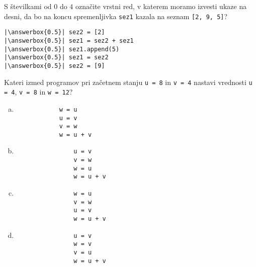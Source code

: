 \documentclass[arhiv, 10pt]{../izpit}
\newcommand{\inlinepy}[1]{\texttt{#1}}
\newcommand{\answerbox}[1]{\framebox{\vphantom{\large M}\hspace{#1cm}}}
\begin{document}
        \naloga*
        \begin{multicols}{2}
        \noindent 
        S številkami od $0$ do $4$ označite vrstni red, v katerem moramo izvesti ukaze na desni, da bo na koncu spremenljivka \inlinepy{sez1} kazala na seznam \inlinepy{[2, 9, 5]}?
    
        \columnbreak
        \noindent
        \begin{verbatim}
|\answerbox{0.5}| sez2 = [2]
|\answerbox{0.5}| sez1 = sez2 + sez1
|\answerbox{0.5}| sez1.append(5)
|\answerbox{0.5}| sez1 = sez2
|\answerbox{0.5}| sez2 = [9]

        \end{verbatim}
        \end{multicols}
    
            
        \naloga*
        
        Kateri izmed programov pri začetnem stanju
            \inlinepy{u = 8} in
            \inlinepy{v = 4}
        nastavi vrednosti
            \inlinepy{u = 4},
            \inlinepy{v = 8} in
            \inlinepy{w = 12}?
    
        \begin{multicols}{4}
        \begin{enumerate}[(a)]
\item 
            \begin{verbatim}
            w = u
            u = v
            v = w
            w = u + v
            \end{verbatim}
        
\item 
                \begin{verbatim}
                u = v
                v = w
                w = u
                w = u + v
                \end{verbatim}
            
\item 
                \begin{verbatim}
                w = u
                v = w
                u = v
                w = u + v
                \end{verbatim}
            
\item 
                \begin{verbatim}
                u = v
                w = v
                v = u
                w = u + v
                \end{verbatim}
            
\end{enumerate}

        \end{multicols}
    
\end{document}
